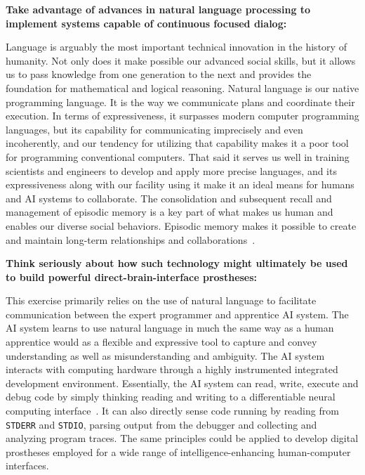 
{\bf{Take advantage of advances in natural language processing to implement systems capable of continuous focused dialog:}}

Language is arguably the most important technical innovation in the history of humanity. Not only does it make possible our advanced social skills, but it allows us to pass knowledge from one generation to the next and provides the foundation for mathematical and logical reasoning. Natural language is our native programming language. It is the way we communicate plans and coordinate their execution. In terms of expressiveness, it surpasses modern computer programming languages, but its capability for communicating imprecisely and even incoherently, and our tendency for utilizing that capability makes it a poor tool for programming conventional computers. That said it serves us well in training scientists and engineers to develop and apply more precise languages, and its expressiveness along with our facility using it make it an ideal means for humans and AI systems to collaborate. The consolidation and subsequent recall and management of episodic memory is a key part of what makes us human and enables our diverse social behaviors. Episodic memory makes it possible to create and maintain long-term relationships and collaborations~\cite{PritzeletalICML-17,MoscovitchetalARP-16,OReillyetalCS-15}.


{\bf{Think seriously about how such technology might ultimately be used to build powerful direct-brain-interface prostheses:}}

This exercise primarily relies on the use of natural language to facilitate communication between the expert programmer and apprentice AI system. The AI system learns to use natural language in much the same way as a human apprentice would \emdash{} as a flexible and expressive tool to capture and convey understanding as well as misunderstanding and ambiguity. The AI system interacts with computing hardware through a highly instrumented integrated development environment. Essentially, the AI system can read, write, execute and debug code by simply thinking \emdash{} reading and writing to a differentiable neural computing interface~\cite{GravesetalNATURE-16}. It can also directly sense code running by reading from {\tt{STDERR}} and {\tt{STDIO}}, parsing output from the debugger and collecting and analyzing program traces. The same principles could be applied to develop digital prostheses employed for a wide range of intelligence-enhancing human-computer interfaces.

